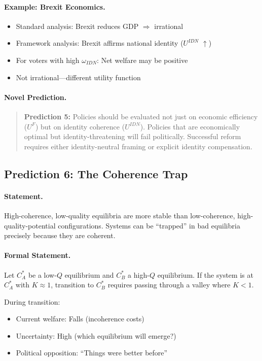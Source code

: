 \documentclass[12pt,a4paper]{article}
\begin{document}
\paragraph{Example: Brexit Economics.}
\begin{itemize}
  \item Standard analysis: Brexit reduces GDP $\Rightarrow$ irrational
  \item Framework analysis: Brexit affirms national identity ($U^{IDN}$ $\uparrow$)
  \item For voters with high $\omega_{IDN}$: Net welfare may be positive
  \item Not irrational---different utility function
\end{itemize}

\paragraph{Novel Prediction.}
\begin{quote}
\textbf{Prediction 5:} Policies should be evaluated not just on
economic efficiency ($U^F$) but on identity coherence ($U^{IDN}$).
Policies that are economically optimal but identity-threatening
will fail politically. Successful reform requires either
identity-neutral framing or explicit identity compensation.
\end{quote}

\subsection{Prediction 6: The Coherence Trap}

\paragraph{Statement.}
High-coherence, low-quality equilibria are more stable than
low-coherence, high-quality-potential configurations.
Systems can be ``trapped'' in bad equilibria precisely because
they are coherent.

\paragraph{Formal Statement.}
Let $C^*_A$ be a low-$Q$ equilibrium and $C^*_B$ a high-$Q$ equilibrium.
If the system is at $C^*_A$ with $K \approx 1$, transition to $C^*_B$
requires passing through a valley where $K < 1$.

During transition:
\begin{itemize}
  \item Current welfare: Falls (incoherence costs)
  \item Uncertainty: High (which equilibrium will emerge?)
  \item Political opposition: ``Things were better before''
\end{itemize}
\end{document}
